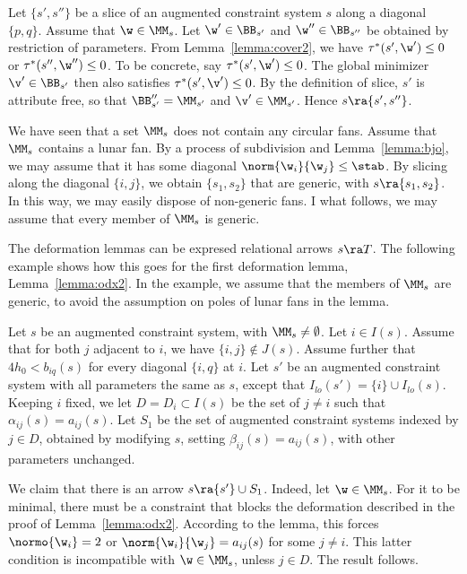 \begin{example}[slice]  Let $\{s',s''\}$ be a slice of
an augmented constraint system $s$ along
a diagonal $\{p,q\}$.  Assume that $\w\in\MM_s$.
Let $\w'\in \BB_{s'}$ and $\w''\in \BB_{s''}$ be obtained
by restriction of parameters.  From Lemma~\ref{lemma:cover2},
we have $\tau^*(s',\w')\le 0$ or $\tau^*(s'',\w'')\le0$.  To be
concrete, say $\tau^*(s',\w')\le 0$.  The global minimizer
$\v'\in\BB_{s'}$
then also satisfies $\tau^*(s',\v')\le 0$.  By the definition of
slice, $s'$ is attribute free, so that $\BB''_{s'}=\MM_{s'}$ and
$\v'\in \MM_{s'}$.  Hence $s\ra\{s',s''\}$.
\end{example}

\begin{remark}
We have seen that a set $\MM_s$ does not contain any circular fans.
Assume that $\MM_s$ contains a lunar fan.
By a process of subdivision and Lemma~\ref{lemma:bjo}, we may assume
that it has some diagonal $\norm{\w_i}{\w_j}\le\stab$.  By slicing
along
the diagonal $\{i,j\}$, we obtain $\{s_1,s_2\}$ that are generic, with
$s\ra\{s_1,s_2\}$.  In this way, we may easily dispose of non-generic
fans.  I what follows, we may assume that every member of $\MM_s$ is
generic.
\end{remark}

The deformation lemmas can be expresed relational
arrows $s\ra T$.  The following example shows how this goes
for the first deformation lemma, Lemma~\ref{lemma:odx2}.  
In the example, we assume
that the members of $\MM_s$ are generic, to avoid the assumption
on poles of lunar fans in the lemma.

\begin{example}[deformation]  Let $s$ be an augmented constraint
  system, with $\MM_s\ne\emptyset$.  Let $i\in I(s)$.
Assume that for both $j$ adjacent to $i$, we have $\{i,j\}\not\in
J(s)$.
Assume further that $4h_0 < b_{iq}(s)$ for every diagonal $\{i,q\}$ at
$i$.  Let $s'$ be an augmented constraint system with all parameters
the same as $s$, except that $I_{lo}(s') = \{i\}\cup I_{lo}(s)$.
Keeping $i$ fixed, we
let $D=D_i\subset I(s)$ be the set of $j\ne i$ such that 
$\alpha_{ij}(s)=a_{ij}(s)$. 
Let $S_1$ be the set of augmented constraint systems indexed by $j\in
D$,
obtained by
modifying $s$, setting $\beta_{ij}(s)=a_{ij}(s)$, with other
parameters unchanged.

We claim that there is an arrow $s\ra \{s'\}\cup S_1$.  Indeed, let
$\w\in \MM_s$.  For it to be minimal, there must be a constraint
that blocks the  deformation described in the proof of
Lemma~\ref{lemma:odx2}.
According to the lemma, this forces $\normo{\w_i}=2$ or
$\norm{\w_i}{\w_j}=a_{ij}(s)$ for some $j\ne i$.  This latter
condition
is incompatible with $\w\in \MM_s$, unless $j\in D$.  The result
follows.
\end{example}


